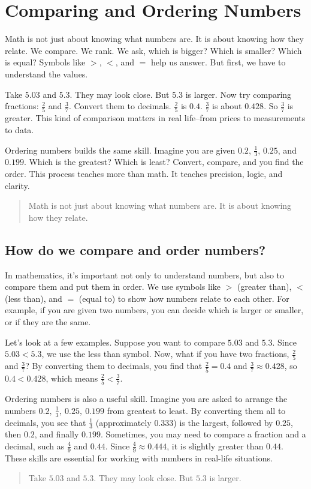 \cleardoublepage

\section{Comparing and Ordering Numbers}

Math is not just about knowing what numbers are. It is about knowing how they
relate. We compare. We rank. We ask, which is bigger? Which is smaller? Which is
equal? Symbols like \(>\), \(<\), and \(=\) help us answer. But first, we have to
understand the values.

Take \(5.03\) and \(5.3\). They may look close. But \(5.3\) is larger. Now try
comparing fractions: \(\frac{2}{5}\) and \(\frac{3}{7}\). Convert them to
decimals. \(\frac{2}{5}\) is \(0.4\). \(\frac{3}{7}\) is about \(0.428\). So
\(\frac{3}{7}\) is greater. This kind of comparison matters in real life--from
prices to measurements to data.

Ordering numbers builds the same skill. Imagine you are given \(0.2\),
\(\frac{1}{3}\), \(0.25\), and \(0.199\). Which is the greatest? Which is least?
Convert, compare, and you find the order. This process teaches more than math. It
teaches precision, logic, and clarity.

\blockquote{Math is not just about knowing what numbers are. It is about knowing
how they relate.}

\subsection{How do we compare and order numbers?}

In mathematics, it's important not only to understand numbers, but also to compare
them and put them in order. We use symbols like \(>\) (greater than), \(<\) (less
than), and \(=\) (equal to) to show how numbers relate to each other. For example,
if you are given two numbers, you can decide which is larger or smaller, or if
they are the same.

Let's look at a few examples. Suppose you want to compare \(5.03\) and \(5.3\).
Since \(5.03 < 5.3\), we use the less than symbol. Now, what if you have two
fractions, \(\frac{2}{5}\) and \(\frac{3}{7}\)? By converting them to decimals,
you find that \(\frac{2}{5} = 0.4\) and \(\frac{3}{7} \approx 0.428\), so
\(0.4 < 0.428\), which means \(\frac{2}{5} < \frac{3}{7}\).

Ordering numbers is also a useful skill. Imagine you are asked to arrange the
numbers \(0.2,\ \frac{1}{3},\ 0.25,\ 0.199\) from greatest to least. By
converting them all to decimals, you see that \(\frac{1}{3}\) (approximately
\(0.333\)) is the largest, followed by \(0.25\), then \(0.2\), and finally
\(0.199\). Sometimes, you may need to compare a fraction and a decimal, such as
\(\frac{4}{9}\) and \(0.44\). Since \(\frac{4}{9} \approx 0.444\), it is slightly
greater than \(0.44\). These skills are essential for working with numbers in
real-life situations.

\blockquote{Take \(5.03\) and \(5.3\). They may look close. But \(5.3\) is
larger.}


% 
% 
% 
